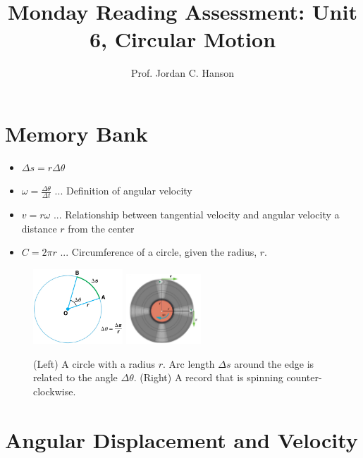 \documentclass{article}
\begin{document}
\title{Monday Reading Assessment: Unit 6, Circular Motion}
\author{Prof. Jordan C. Hanson}

\maketitle

\section{Memory Bank}

\begin{itemize}
\item $\Delta s = r \Delta \theta$
\item $\omega = \frac{\Delta \theta}{\Delta t}$ ... Definition of angular velocity
\item $v = r\omega $ ... Relationship between tangential velocity and angular velocity a distance $r$ from the center
\item $C = 2\pi r$ ... Circumference of a circle, given the radius, $r$.
\end{itemize}

\begin{figure}[ht]
\centering
\includegraphics[width=0.3\textwidth]{circle.jpeg}
\includegraphics[width=0.25\textwidth]{record.png}
\caption{\label{fig:record} (Left) A circle with a radius $r$.  Arc length $\Delta s$ around the edge is related to the angle $\Delta \theta$.  (Right) A record that is spinning counter-clockwise.}
\end{figure}

\section{Angular Displacement and Velocity}
\end{document}
